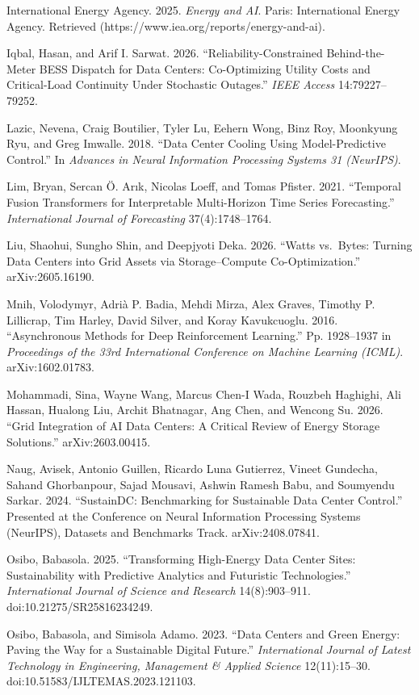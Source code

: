 \documentclass[
  11pt,
]{article}
\begin{document}
International Energy Agency. 2025. \emph{Energy and AI}. Paris:
International Energy Agency. Retrieved
(https://www.iea.org/reports/energy-and-ai).

Iqbal, Hasan, and Arif I. Sarwat. 2026. ``Reliability-Constrained
Behind-the-Meter BESS Dispatch for Data Centers: Co-Optimizing Utility
Costs and Critical-Load Continuity Under Stochastic Outages.''
\emph{IEEE Access} 14:79227--79252.

Lazic, Nevena, Craig Boutilier, Tyler Lu, Eehern Wong, Binz Roy,
Moonkyung Ryu, and Greg Imwalle. 2018. ``Data Center Cooling Using
Model-Predictive Control.'' In \emph{Advances in Neural Information
Processing Systems 31 (NeurIPS)}.

Lim, Bryan, Sercan Ö. Arık, Nicolas Loeff, and Tomas Pfister. 2021.
``Temporal Fusion Transformers for Interpretable Multi-Horizon Time
Series Forecasting.'' \emph{International Journal of Forecasting}
37(4):1748--1764.

Liu, Shaohui, Sungho Shin, and Deepjyoti Deka. 2026. ``Watts vs.~Bytes:
Turning Data Centers into Grid Assets via Storage--Compute
Co-Optimization.'' arXiv:2605.16190.

Mnih, Volodymyr, Adrià P. Badia, Mehdi Mirza, Alex Graves, Timothy P.
Lillicrap, Tim Harley, David Silver, and Koray Kavukcuoglu. 2016.
``Asynchronous Methods for Deep Reinforcement Learning.'' Pp. 1928--1937
in \emph{Proceedings of the 33rd International Conference on Machine
Learning (ICML)}. arXiv:1602.01783.

Mohammadi, Sina, Wayne Wang, Marcus Chen-I Wada, Rouzbeh Haghighi, Ali
Hassan, Hualong Liu, Archit Bhatnagar, Ang Chen, and Wencong Su. 2026.
``Grid Integration of AI Data Centers: A Critical Review of Energy
Storage Solutions.'' arXiv:2603.00415.

Naug, Avisek, Antonio Guillen, Ricardo Luna Gutierrez, Vineet Gundecha,
Sahand Ghorbanpour, Sajad Mousavi, Ashwin Ramesh Babu, and Soumyendu
Sarkar. 2024. ``SustainDC: Benchmarking for Sustainable Data Center
Control.'' Presented at the Conference on Neural Information Processing
Systems (NeurIPS), Datasets and Benchmarks Track. arXiv:2408.07841.

Osibo, Babasola. 2025. ``Transforming High-Energy Data Center Sites:
Sustainability with Predictive Analytics and Futuristic Technologies.''
\emph{International Journal of Science and Research} 14(8):903--911.
doi:10.21275/SR25816234249.

Osibo, Babasola, and Simisola Adamo. 2023. ``Data Centers and Green
Energy: Paving the Way for a Sustainable Digital Future.''
\emph{International Journal of Latest Technology in Engineering,
Management \& Applied Science} 12(11):15--30.
doi:10.51583/IJLTEMAS.2023.121103.
\end{document}
